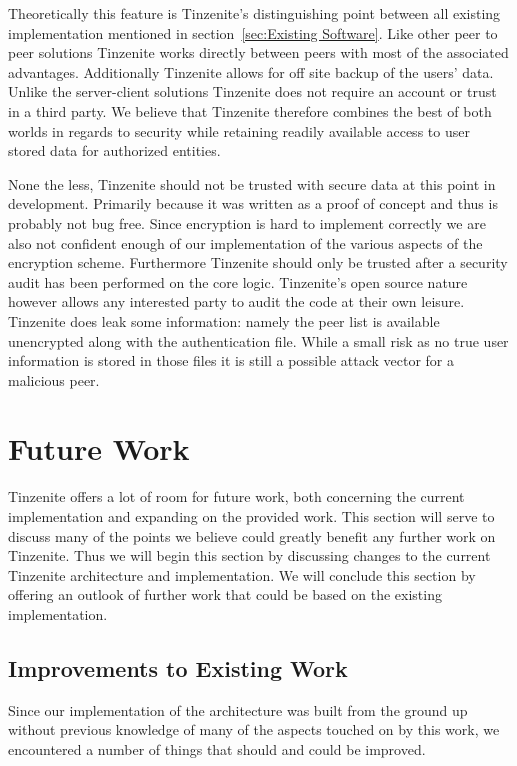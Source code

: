 Theoretically this feature is Tinzenite's distinguishing point between all existing implementation mentioned in section~\ref{sec:Existing Software}.
Like other peer to peer solutions Tinzenite works directly between peers with most of the associated advantages.
Additionally Tinzenite allows for off site backup of the users' data.
Unlike the server-client solutions Tinzenite does not require an account or trust in a third party.
We believe that Tinzenite therefore combines the best of both worlds in regards to security while retaining readily available access to user stored data for authorized entities.

None the less, Tinzenite should not be trusted with secure data at this point in development.
Primarily because it was written as a proof of concept and thus is probably not bug free.
Since encryption is hard to implement correctly we are also not confident enough of our implementation of the various aspects of the encryption scheme.
Furthermore Tinzenite should only be trusted after a security audit has been performed on the core logic.
Tinzenite's open source nature however allows any interested party to audit the code at their own leisure.
Tinzenite does leak some information: namely the peer list is available unencrypted along with the authentication file.
While a small risk as no true user information is stored in those files it is still a possible attack vector for a malicious peer.

\section{Future Work}
\label{sec:Future Work}

Tinzenite offers a lot of room for future work, both concerning the current implementation and expanding on the provided work.
This section will serve to discuss many of the points we believe could greatly benefit any further work on Tinzenite.
Thus we will begin this section by discussing changes to the current Tinzenite architecture and implementation.
We will conclude this section by offering an outlook of further work that could be based on the existing implementation.

\subsection{Improvements to Existing Work}
\label{sub:Improvements to Existing Work}

Since our implementation of the architecture was built from the ground up without previous knowledge of many of the aspects touched on by this work, we encountered a number of things that should and could be improved.

